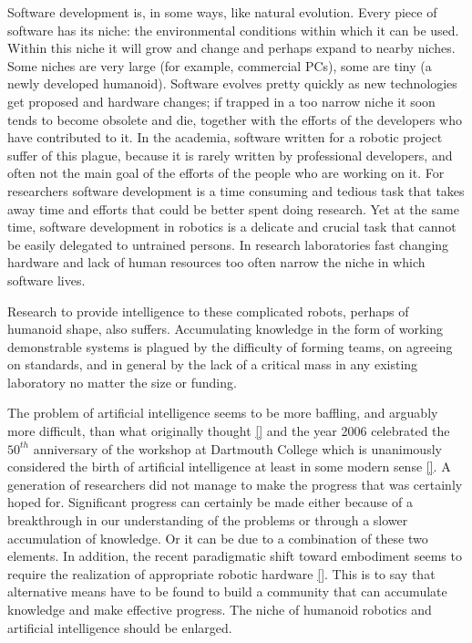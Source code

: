 Software development is, in some ways, like natural 
evolution.  Every piece of software has its niche:
the environmental conditions within which it can be
used.  Within this niche it will grow and change and 
perhaps expand to nearby niches.
Some niches are very large (for example, commercial PCs), some are
tiny (a newly developed humanoid). Software evolves pretty quickly 
as new technologies get proposed and hardware changes; if trapped 
in a too narrow niche it soon tends to become obsolete and die, 
together with the efforts of the developers who have contributed 
to it. In the academia, software written for a robotic 
project suffer of this plague, because it is rarely written 
by professional developers, and often not the main goal of the 
efforts of the people who are working on it. For researchers 
software development is a time consuming and tedious task that 
takes away time and efforts that could be better spent doing 
research. Yet at the same time, software development in 
robotics is a delicate and crucial task that cannot be easily 
delegated to untrained persons. In research laboratories 
fast changing hardware and lack of human resources too often 
narrow the niche in which software lives.

%
Research to provide intelligence to these complicated robots, perhaps
of humanoid shape, also suffers. Accumulating knowledge 
in the form of working demonstrable systems is plagued by the   
difficulty of forming teams, on agreeing on standards, and in 
general by the lack of a critical mass in any existing laboratory no 
matter the size or funding. 

The problem of artificial intelligence seems to be more baffling, and 
arguably more difficult, than what originally thought \ref{} and the year 2006 
celebrated the $50^{th}$ anniversary of the workshop at Dartmouth College
which is unanimously considered the birth of artificial intelligence at 
least in some modern sense \ref{}. %
A generation of researchers did not manage to make the progress that was
certainly hoped for. Significant progress can certainly be made either 
because of a breakthrough in our understanding of the problems or through 
a slower accumulation of knowledge. Or it can be due to a combination of 
these two elements. In addition, the recent paradigmatic shift toward embodiment 
seems to require the realization of appropriate robotic hardware \ref{}. 
This is to say that alternative means have to be found to build a community
that can accumulate knowledge and make effective progress. The niche of
humanoid robotics and artificial intelligence should be enlarged.

